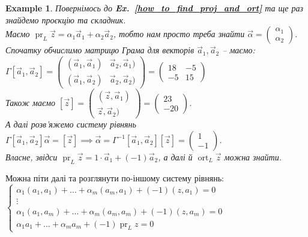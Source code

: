 \documentclass[a4paper, 10pt]{article}
\theoremstyle{theoremdd}
\newtheorem{example}[theorem]{Example}
\newcommand\exref[1]{\textbf{Ex.~\ref{#1}}}
\DeclareMathOperator{\ort}{ort}
\DeclareMathOperator{\pr}{pr}
\begin{document}
\begin{example}
Повернімось до \exref{how_to_find_proj_and_ort} та ще раз знайдемо проєкцію та складник.\\
Маємо $\pr_L \vec{z} = \alpha_1 \vec{a}_1 + \alpha_2 \vec{a}_2$, тобто нам просто треба знайти $\vec{\alpha} = \begin{pmatrix}
\alpha_1 \\ \alpha_2
\end{pmatrix}$.\\
Спочатку обчислимо матрицю Грама для векторів $\vec{a}_1,\vec{a}_2$ -- маємо:\\
$\Gamma[\vec{a}_1,\vec{a}_2] = \begin{pmatrix}
(\vec{a}_1,\vec{a}_1) & \vec{a}_2, \vec{a}_1) \\
(\vec{a}_1,\vec{a}_2) & \vec{a}_2, \vec{a}_2) 
\end{pmatrix} = \begin{pmatrix}
18 & -5 \\
-5 & 15
\end{pmatrix}$\\
Також маємо $[\vec{z}] = \begin{pmatrix}
(\vec{z},\vec{a}_1) \\
\vec{z},\vec{a}_2)
\end{pmatrix} = \begin{pmatrix}
23 \\ -20
\end{pmatrix}$.\\
А далі розв'яжемо систему рівнянь $\Gamma[\vec{a}_1,\vec{a}_2] \vec{\alpha} = [\vec{z}] \implies \vec{\alpha} = \Gamma^{-1}[\vec{a}_1,\vec{a}_2] [\vec{z}] = \begin{pmatrix}
1 \\ -1
\end{pmatrix}$.\\
Власне, звідси $\pr_L \vec{z} = 1 \cdot \vec{a}_1 + (-1) \vec{a}_2$, а далі й $\ort_L \vec{z}$ можна знайти.
\end{example}
\noindent
Можна піти далі та розглянути по-іншому систему рівнянь:\\
$\begin{cases}
\alpha_1 (a_1,a_1) + \dots + \alpha_m (a_m,a_1) + (-1) (z,a_1) = 0 \\
\vdots \\
\alpha_1 (a_1,a_m) + \dots + \alpha_m (a_m,a_m) + (-1) (z,a_m) = 0 \\
\alpha_1 a_1 + \dots + \alpha_m a_m + (-1) \pr_L z = 0
\end{cases}$\\
\end{document}
